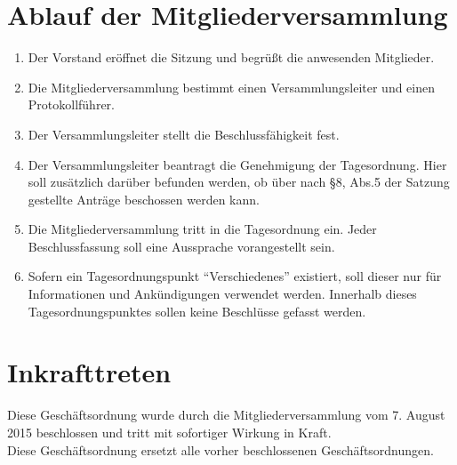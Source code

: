 \documentclass[a4paper, 12pt]{scrartcl}
\begin{document}
\section{Ablauf der Mitgliederversammlung}
\begin{enumerate} 
	\item Der Vorstand eröffnet die Sitzung und begrüßt die anwesenden Mitglieder.
	\item Die Mitgliederversammlung bestimmt einen Versammlungsleiter und einen Protokollführer.
	\item Der Versammlungsleiter stellt die Beschlussfähigkeit fest.
	\item Der Versammlungsleiter beantragt die Genehmigung der Tagesordnung. Hier soll zusätzlich darüber befunden werden, ob über nach §8, Abs.5 der Satzung gestellte Anträge beschossen werden kann.
	\item Die Mitgliederversammlung tritt in die Tagesordnung ein. Jeder Beschlussfassung soll eine Aussprache vorangestellt sein.
	\item Sofern ein Tagesordnungspunkt "`Verschiedenes"' existiert, soll dieser nur für Informationen und Ankündigungen verwendet werden. Innerhalb dieses Tagesordnungspunktes sollen keine Beschlüsse gefasst werden.
\end{enumerate}

\section{Inkrafttreten}
Diese Geschäftsordnung wurde durch die Mitgliederversammlung vom 7. August 2015 beschlossen und tritt mit sofortiger Wirkung in Kraft.\\
Diese Geschäftsordnung ersetzt alle vorher beschlossenen Geschäftsordnungen.
\end{document}
